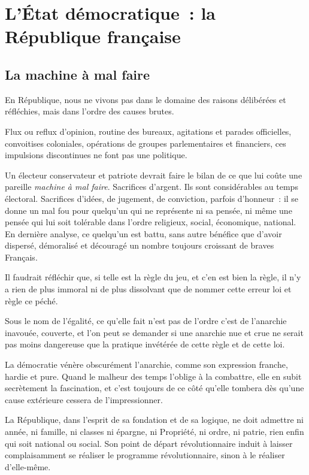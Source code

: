 \documentclass[french,twoside]{book} %
\begin{document}
\section[L’État démocratique : la République française]{L’État démocratique : la République française}
\subsection[La machine à mal faire]{La machine à mal faire}
\noindent En République, nous ne vivons pas dans le domaine des raisons délibérées et réfléchies, mais dans l’ordre des causes brutes.\par
Flux ou reflux d’opinion, routine des bureaux, agitations et parades officielles, convoitises coloniales, opérations de groupes parlementaires et financiers, ces impulsions discontinues ne font pas une politique.\par
Un électeur conservateur et patriote devrait faire le bilan de ce que lui coûte une pareille \emph{machine à mal faire}. Sacrifices d’argent. Ils sont considérables au temps électoral. Sacrifices d’idées, de jugement, de conviction, parfois d’honneur : il se donne un mal fou pour quelqu’un qui ne représente ni sa pensée, ni même une pensée qui lui soit tolérable dans l’ordre religieux, social, économique, national. En dernière analyse, ce quelqu’un est battu, sans autre bénéfice que d’avoir dispersé, démoralisé et découragé un nombre toujours croissant de braves Français.\par
Il faudrait réfléchir que, si telle est la règle du jeu, et c’en est bien la règle, il n’y a rien de plus immoral ni de plus dissolvant que de nommer cette erreur loi et règle ce péché.\par
Sous le nom de l’égalité, ce qu’elle fait n’est pas de l’ordre c’est de l’anarchie inavouée, couverte, et l’on peut se demander si une anarchie nue et crue ne serait pas moins dangereuse que la pratique invétérée de cette règle et de cette loi.\par
La démocratie vénère obscurément l’anarchie, comme son expression franche, hardie et pure. Quand le malheur des temps l’oblige à la combattre, elle en subit secrètement la fascination, et c’est toujours de ce côté qu’elle tombera dès qu’une cause extérieure cessera de l’impressionner.\par
La République, dans l’esprit de sa fondation et de sa logique, ne doit admettre ni année, ni famille, ni classes ni épargne, ni Propriété, ni ordre, ni patrie, rien enfin qui soit national ou social. Son point de départ révolutionnaire induit à laisser complaisamment se réaliser le programme révolutionnaire, sinon à le réaliser d’elle-même.\par
\end{document}
